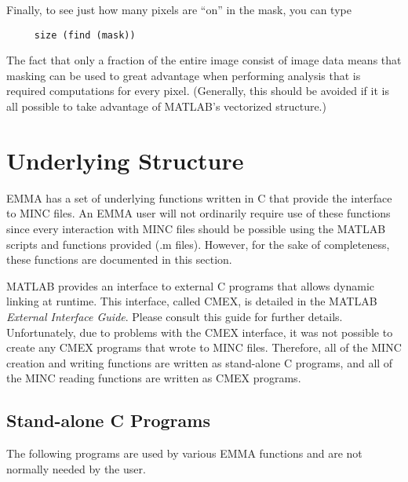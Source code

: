 Finally, to see just how many pixels are ``on'' in the mask, you can type
\begin{verbatim}
     size (find (mask))
\end{verbatim}
The fact that only a fraction of the entire image consist of image
data means that masking can be used to great advantage when performing
analysis that is required computations for every pixel.  (Generally,
this should be avoided if it is all possible to take advantage of
MATLAB's vectorized structure.)

\newpage
\section{Underlying Structure}

EMMA has a set of underlying functions written in C that provide the
interface to MINC files.  An EMMA user will not ordinarily require use
of these functions since every interaction with MINC files should be
possible using the MATLAB scripts and functions provided (.m files).
However, for the sake of completeness, these functions are documented
in this section.

MATLAB provides an interface to external C programs that allows
dynamic linking at runtime.  This interface, called CMEX, is detailed
in the MATLAB {\em External Interface Guide}.  Please consult this
guide for further details.  Unfortunately, due to problems with the
CMEX interface, it was not possible to create any CMEX programs that
wrote to MINC files.  Therefore, all of the MINC creation and writing
functions are written as stand-alone C programs, and all of the MINC
reading functions are written as CMEX programs.


\subsection {Stand-alone C Programs}

The following programs are used by various EMMA functions and are not
normally needed by the user.  

